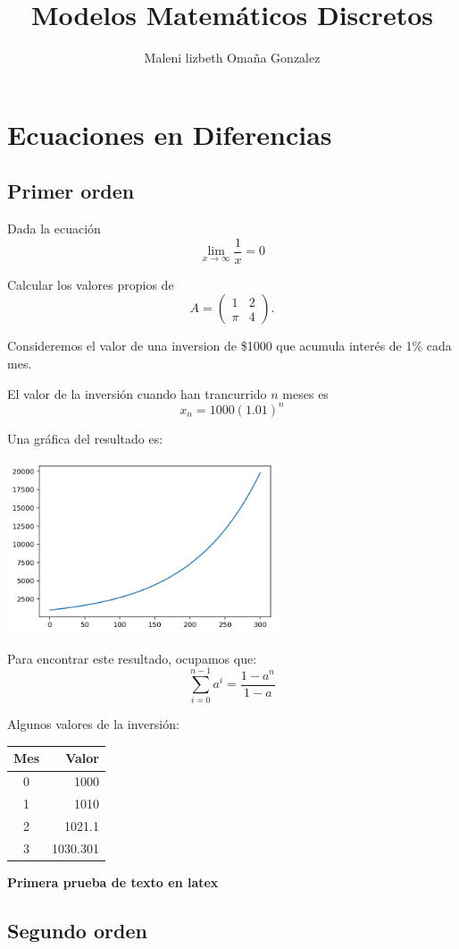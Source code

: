 \documentclass{article}
\title{Modelos Matemáticos Discretos}
\author{Maleni lizbeth Omaña Gonzalez}
\begin{document}
\maketitle
\section{Ecuaciones en Diferencias}
\subsection{Primer orden}
Dada la ecuación $$\lim_{x\to\infty}\frac{1}{x}=0$$

Calcular los valores propios de $$A=
\begin{pmatrix}
1 & 2\\
\pi & 4
\end{pmatrix}.
$$

Consideremos el valor de una inversion de \$1000 que acumula interés de 1\% cada mes.

El valor de la inversión cuando han trancurrido $n$ meses es $$x_n=1000(1.01)^n$$

Una gráfica del resultado es:

\begin{center}
\includegraphics[width=8cm]{grafica}
\end{center}

Para encontrar este resultado, ocupamos que:
$$\sum_{i=0}^{n-1}a^i=\frac{1-a^{n}}{1-a}$$

Algunos valores de la inversión:
\begin{center}
\begin{tabular}{|c|r|}
\hline
\hline
Mes & Valor\\
\hline
0 & 1000\\
1 & 1010\\
2 & 1021.1\\
3 & 1030.301\\
\hline
\end{tabular}
\end{center}


\begin{center}
\huge
\textbf{Primera prueba de texto en latex}
\end{center}

\subsection{Segundo orden}
\end{document}
